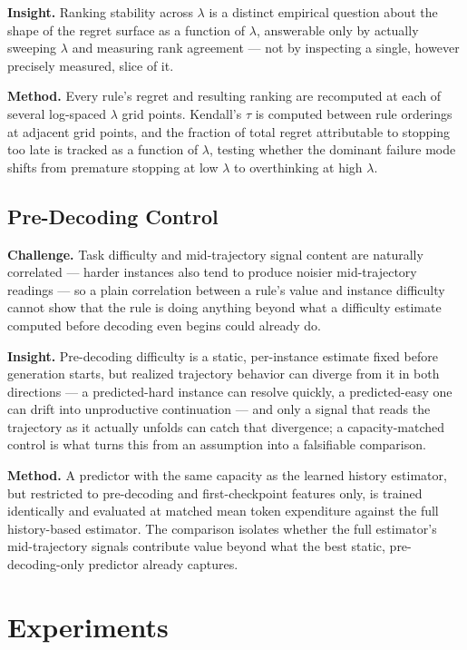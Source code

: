 \documentclass[11pt]{article}
\begin{document}
\textbf{Insight.} Ranking stability across $\lambda$ is a distinct empirical question about the shape of the regret surface as a function of $\lambda$, answerable only by actually sweeping $\lambda$ and measuring rank agreement --- not by inspecting a single, however precisely measured, slice of it.

\textbf{Method.} Every rule's regret and resulting ranking are recomputed at each of several log-spaced $\lambda$ grid points. Kendall's $\tau$ is computed between rule orderings at adjacent grid points, and the fraction of total regret attributable to stopping too late is tracked as a function of $\lambda$, testing whether the dominant failure mode shifts from premature stopping at low $\lambda$ to overthinking at high $\lambda$.

\subsection{Pre-Decoding Control}
\textbf{Challenge.} Task difficulty and mid-trajectory signal content are naturally correlated --- harder instances also tend to produce noisier mid-trajectory readings --- so a plain correlation between a rule's value and instance difficulty cannot show that the rule is doing anything beyond what a difficulty estimate computed before decoding even begins could already do.

\textbf{Insight.} Pre-decoding difficulty is a static, per-instance estimate fixed before generation starts, but realized trajectory behavior can diverge from it in both directions --- a predicted-hard instance can resolve quickly, a predicted-easy one can drift into unproductive continuation --- and only a signal that reads the trajectory as it actually unfolds can catch that divergence; a capacity-matched control is what turns this from an assumption into a falsifiable comparison.

\textbf{Method.} A predictor with the same capacity as the learned history estimator, but restricted to pre-decoding and first-checkpoint features only, is trained identically and evaluated at matched mean token expenditure against the full history-based estimator. The comparison isolates whether the full estimator's mid-trajectory signals contribute value beyond what the best static, pre-decoding-only predictor already captures.

\section{Experiments}
\end{document}
